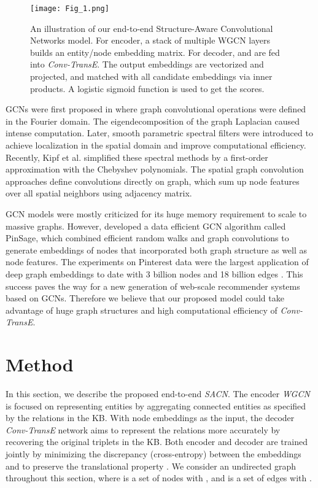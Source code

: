 \documentclass[letterpaper]{article} \usepackage{aaai19}  \usepackage{times}  \usepackage{helvet}  \usepackage{courier}  \usepackage{url}  \usepackage{graphicx}  \usepackage{amsmath}
\begin{document}
\begin{figure*}
    \texttt{[image: Fig\_1.png]}
    \caption{An illustration of our end-to-end Structure-Aware Convolutional Networks model. For encoder, a stack of multiple WGCN layers builds an entity/node embedding matrix. For decoder,  and  are fed into {\it Conv-TransE}. The output embeddings are vectorized and projected, and matched with all candidate  embeddings via inner products. A logistic sigmoid function is used to get the scores.
    }
    \medskip
\label{fig:structure}
\end{figure*}

GCNs were first proposed in \cite{bruna2013spectral} where graph convolutional operations were defined in the Fourier domain. The eigendecomposition of the graph Laplacian caused intense computation. Later, smooth parametric spectral filters \cite{henaff2015deep,defferrard2016convolutional} were introduced to achieve localization in the spatial domain and improve computational efficiency.
Recently, Kipf et al. \cite{kipf2016semi} simplified these spectral methods by a first-order approximation with the Chebyshev polynomials. 
The spatial graph convolution approaches \cite{hamilton2017inductive} define convolutions directly on graph, which sum up node features over all spatial neighbors using adjacency matrix.


GCN models were mostly criticized for its huge memory requirement to scale to massive graphs. However, \cite{ying2018kdd} developed a data efficient GCN algorithm called PinSage, which combined efficient random walks and graph convolutions to generate embeddings of nodes that incorporated both graph structure as well as node features. The experiments on Pinterest data were the largest application of deep graph embeddings to date with 3 billion nodes and 18 billion edges \cite{ying2018kdd}. This success paves the way for a new generation of web-scale recommender systems based on GCNs. Therefore we believe that our proposed model could take advantage of huge graph structures and high computational efficiency of {\it Conv-TransE}.



\section{Method}

In this section, we describe the proposed end-to-end {\it SACN}. The encoder {\it WGCN} is focused on representing entities by aggregating connected entities as specified by the relations in the KB. With node embeddings as the input, the decoder {\it Conv-TransE} network aims to represent the relations more accurately by recovering the original triplets in the KB. Both encoder and decoder are trained jointly by minimizing the discrepancy (cross-entropy) between the embeddings  and  to preserve the translational property . We consider an undirected graph  throughout this section, where  is a set of nodes with , and  is a set of edges with . 
\end{document}
